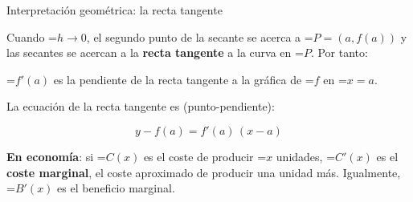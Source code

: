 \documentclass[11pt,a4paper]{article}
\newcommand{\fmm}[1]{\setbox0=\hbox{$#1$}\ifdim\wd0>\linewidth\[#1\]\else\mbox{\box0}\fi}
\newcommand{\fmuline}[1]{\textbf{\color{fmaccent}#1}}
\begin{document}
  
\begin{fmprop}{Interpretación geométrica: la recta tangente}
\par\noindent \begin{minipage}[t]{0.48\linewidth}\vspace{0pt}\raggedright Cuando \fmm{h\to0}, el segundo punto de la secante se acerca a \fmm{P=(a,f(a))} y las secantes se acercan a la \textbf{recta tangente} a la curva en \fmm{P}. Por tanto:

          
\begin{center}\colorbox{fmyellow!45}{\parbox{0.9\linewidth}{\centering\strut \fmm{f'(a)} es la pendiente de la recta tangente a la gráfica de \fmm{f} en \fmm{x=a}.\strut}}\end{center}

          

La ecuación de la recta tangente es (punto-pendiente):

          
\[y-f(a)=f'(a)\,(x-a)\]
\end{minipage}\hfill\begin{minipage}[t]{0.48\linewidth}\vspace{0pt}\raggedright \begin{center}\end{center}\end{minipage}\par\medskip

      
\begin{fmnote}\fmuline{En economía}: si \fmm{C(x)} es el coste de producir \fmm{x} unidades, \fmm{C'(x)} es el \textbf{coste marginal}, el coste aproximado de producir una unidad más. Igualmente, \fmm{B'(x)} es el beneficio marginal.\end{fmnote}
\end{fmprop}
\end{document}
